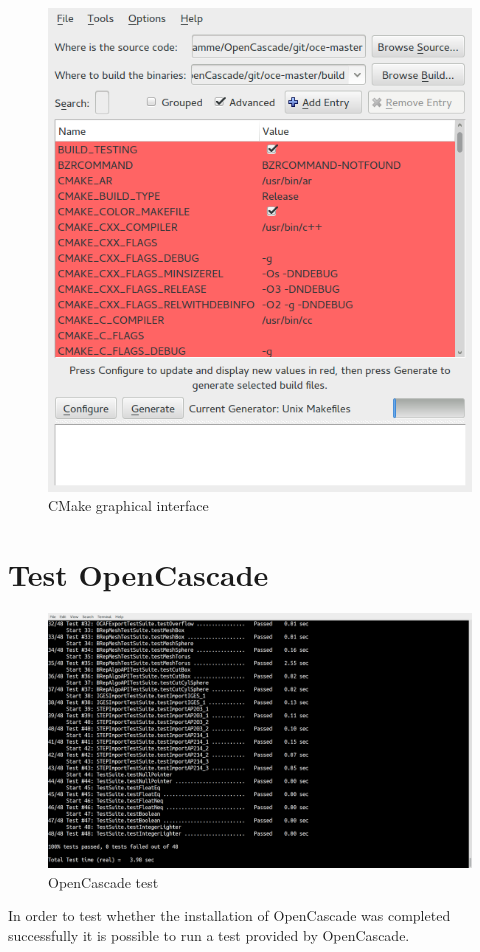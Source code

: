 \documentclass[11pt,a4paper,article,bibtotoc,idxtotoc,headsepline,footsepline,footexclude,DIV13,oneside]{scrbook}
\begin{document}
\begin{figure}
\centering
\includegraphics[scale=0.5]{img/CMake_GUI.png}
\caption{CMake graphical interface}
\label{fig:CMake_GUI}
\end{figure}
\section{Test OpenCascade}
\begin{figure}
\centering
\includegraphics[scale=0.2]{img/OC_Test2.png}
\caption{OpenCascade test}
\label{fig:OC_test}
\end{figure}
In order to test whether the installation of OpenCascade was completed successfully it is possible to run a test provided by OpenCascade. 
\end{document}
